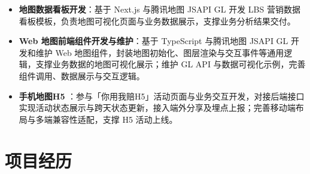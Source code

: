 \documentclass[10pt]{article}
\begin{document}
    \begin{itemize}
        \item \textbf{地图数据看板开发}：基于 Next.js 与腾讯地图 JSAPI GL 开发 LBS 营销数据看板模板，负责地图可视化页面与业务数据展示，支撑业务分析结果交付。
        \item \textbf{Web 地图前端组件开发与维护}：基于 TypeScript 与腾讯地图 JSAPI GL 开发和维护 Web 地图组件，封装地图初始化、图层渲染与交互事件等通用逻辑，支撑业务数据的地图可视化展示；维护 GL API 与数据可视化示例，完善组件调用、数据展示与交互逻辑。
        \item \textbf{手机地图H5 }：参与「你用我赔H5」活动页面与业务交互开发，对接后端接口实现活动状态展示与跨天状态更新，接入端外分享及埋点上报；完善移动端布局与多端兼容性适配，支撑 H5 活动上线。
    \end{itemize}





    \section[项目经历]{\makebox[\iconwidth][c]{\color{primarycolor}{\faProjectDiagram}}\quad 项目经历}
\end{document}

